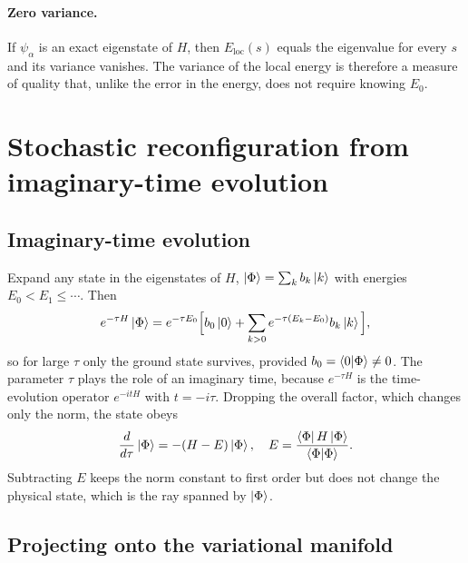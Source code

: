 \documentclass[aps,prb,preprint,amsmath,amssymb,nofootinbib,longbibliography]{revtex4-2}
\newcommand{\Eloc}{E_{\mathrm{loc}}}
\begin{document}
\paragraph*{Zero variance.}
If $\psi_\alpha$ is an exact eigenstate of $H$, then $\Eloc(s)$ equals the eigenvalue for every $s$ and its variance
vanishes. The variance of the local energy is therefore a measure of quality that, unlike the error in the energy,
does not require knowing $E_0$.

\section{Stochastic reconfiguration from imaginary-time evolution}
\label{sec:sr}

\subsection{Imaginary-time evolution}

Expand any state in the eigenstates of $H$, $\ket{\Phi} = \sum_k b_k \ket{k}$ with energies $E_0 < E_1 \le \cdots$.
Then
\begin{equation}
  e^{-\tau H}\ket{\Phi} = e^{-\tau E_0}\Big[b_0\ket{0} + \sum_{k>0} e^{-\tau (E_k - E_0)} b_k\ket{k}\Big],
\end{equation}
so for large $\tau$ only the ground state survives, provided $b_0 = \braket{0|\Phi} \neq 0$. The parameter $\tau$
plays the role of an imaginary time, because $e^{-\tau H}$ is the time-evolution operator $e^{-itH}$ with $t = -i\tau$.
Dropping the overall factor, which changes only the norm, the state obeys
\begin{equation}
  \frac{d}{d\tau}\ket{\Phi} = -(H - E)\ket{\Phi}, \quad E = \frac{\bra{\Phi}H\ket{\Phi}}{\braket{\Phi|\Phi}} .
  \label{eq:imaginary-time}
\end{equation}
Subtracting $E$ keeps the norm constant to first order but does not change the physical state, which is the ray
spanned by $\ket{\Phi}$.

\subsection{Projecting onto the variational manifold}
\end{document}
